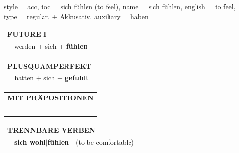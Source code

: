 \begin{verbentry}{
  style = {acc},
  toc = {sich fühlen (to feel)},
  name = {sich fühlen},
  english = {to feel},
  type = {regular, + Akkusativ},
  auxiliary = {haben}
}
\begin{tabular}{rl}
    \multicolumn{2}{l}{\textbf{FUTURE I} }\\
    &werden + sich + \textbf{fühlen}\\
 
  \end{tabular}
\hfill
   \begin{tabular}{rl}
      \multicolumn{2}{l}{\textbf{PLUSQUAMPERFEKT}}\\
    &hatten + sich + \textbf{gefühlt}\\
  \end{tabular}
  
\vspace{10pt}

\begin{tabular}{lll}
\multicolumn{3}{l}{\textbf{MIT PRÄPOSITIONEN}}\\
& \textbf{---} & \\
\end{tabular}
  \hfill
   \begin{tabular}{lll}
      \multicolumn{3}{l}{\textbf{TRENNBARE VERBEN}}\\
     & \textbf{sich wohl$|$fühlen} & (to be comfortable)
  \end{tabular}
  
  \vspace{-5pt}
\end{verbentry}

